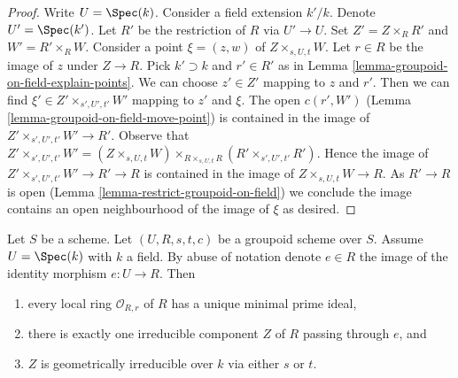 \begin{proof}
Write $U = \Spec(k)$. Consider a field extension $k'/k$. Denote
$U' = \Spec(k')$. Let $R'$ be the restriction of $R$ via $U' \to U$.
Set $Z' = Z \times_R R'$ and $W' = R' \times_R W$.
Consider a point $\xi = (z, w)$ of $Z \times_{s, U, t} W$.
Let $r \in R$ be the image of $z$ under $Z \to R$.
Pick $k' \supset k$ and $r' \in R'$ as in
Lemma \ref{lemma-groupoid-on-field-explain-points}.
We can choose $z' \in Z'$ mapping to $z$ and $r'$.
Then we can find $\xi' \in Z' \times_{s', U', t'} W'$
mapping to $z'$ and $\xi$. The open $c(r', W')$
(Lemma \ref{lemma-groupoid-on-field-move-point}) is
contained in the image of $Z' \times_{s', U', t'} W' \to R'$.
Observe that $Z' \times_{s', U', t'} W' = (Z \times_{s, U, t} W)
\times_{R \times_{s, U, t} R} (R' \times_{s', U', t'} R')$.
Hence the image of $Z' \times_{s', U', t'} W' \to R' \to R$
is contained in the image of $Z \times_{s, U, t} W \to R$.
As $R' \to R$ is open (Lemma \ref{lemma-restrict-groupoid-on-field})
we conclude the image contains an open neighbourhood of
the image of $\xi$ as desired.
\end{proof}

\begin{lemma}
\label{lemma-groupoid-on-field-geometrically-irreducible}
Let $S$ be a scheme. Let $(U, R, s, t, c)$ be a groupoid scheme
over $S$. Assume $U = \Spec(k)$ with $k$ a field.
By abuse of notation denote $e \in R$ the image of the identity
morphism $e : U \to R$. Then
\begin{enumerate}
\item every local ring $\mathcal{O}_{R, r}$ of $R$ has a unique
minimal prime ideal,
\item there is exactly one irreducible component $Z$ of $R$
passing through $e$, and
\item $Z$ is geometrically irreducible over $k$ via either
$s$ or $t$.
\end{enumerate}
\end{lemma}

